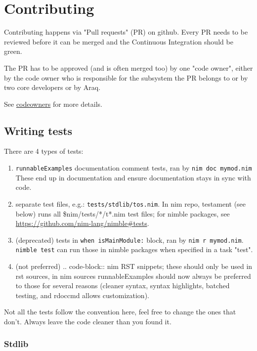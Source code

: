 \hypertarget{contributing}{%
\section{Contributing}\label{contributing}}

Contributing happens via "Pull requests" (PR) on github. Every PR needs
to be reviewed before it can be merged and the Continuous Integration
should be green.

The PR has to be approved (and is often merged too) by one "code owner",
either by the code owner who is responsible for the subsystem the PR
belongs to or by two core developers or by Araq.

See \href{codeowners.html}{codeowners} for more details.

\hypertarget{writing-tests}{%
\subsection{Writing tests}\label{writing-tests}}

There are 4 types of tests:

\begin{enumerate}
\def\labelenumi{\arabic{enumi}.}
\tightlist
\item
  \texttt{runnableExamples} documentation comment tests, ran by
  \texttt{nim\ doc\ mymod.nim} These end up in documentation and ensure
  documentation stays in sync with code.
\item
  separate test files, e.g.: \texttt{tests/stdlib/tos.nim}. In nim repo,
  {testament} (see below) runs all {\$nim/tests/*/t*.nim} test files;
  for nimble packages, see
  \url{https://github.com/nim-lang/nimble\#tests}.
\item
  (deprecated) tests in \texttt{when\ isMainModule:} block, ran by
  \texttt{nim\ r\ mymod.nim}. \texttt{nimble\ test} can run those in
  nimble packages when specified in a {task "test"}.
\item
  (not preferred) {.. code-block:: nim} RST snippets; these should only
  be used in rst sources, in nim sources {runnableExamples} should now
  always be preferred to those for several reasons (cleaner syntax,
  syntax highlights, batched testing, and {rdoccmd} allows
  customization).
\end{enumerate}

Not all the tests follow the convention here, feel free to change the
ones that don't. Always leave the code cleaner than you found it.

\hypertarget{stdlib}{%
\subsubsection{Stdlib}\label{stdlib}}

